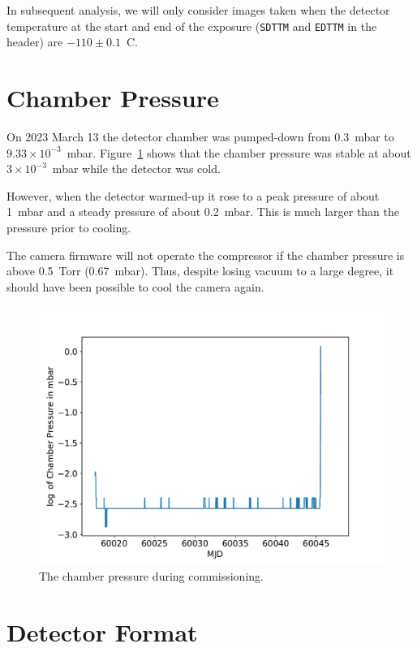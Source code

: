 \documentclass{article}
\begin{document}
In subsequent analysis, we will only consider images taken when the detector temperature at the start and end of the exposure (\verb|SDTTM| and \verb|EDTTM| in the header) are $-110\pm0.1$~C.

\clearpage
\section{Chamber Pressure}

On 2023 March 13 the detector chamber was pumped-down from 0.3~mbar to $9.33\times10^{-3}$~mbar.
Figure~\ref{figure:chamber-pressure} shows that the chamber pressure was stable at about $3\times10^{-3}$~mbar while the detector was cold.

However, when the detector warmed-up it rose to a peak pressure of about 1~mbar and a steady pressure of about 0.2~mbar. This is much larger than the pressure prior to cooling.

The camera firmware will not operate the compressor if the chamber pressure is above 0.5~Torr (0.67~mbar). Thus, despite losing vacuum to a large degree, it should have been possible to cool the camera again.

\begin{figure}[pb]
\begin{center}
\includegraphics[width=0.7\columnwidth]{figures/chamber-pressure.pdf}
\medskip
\caption{The chamber pressure during commissioning.}
\label{figure:chamber-pressure}
\end{center}
\end{figure}

\clearpage
\section{Detector Format}
\end{document}
